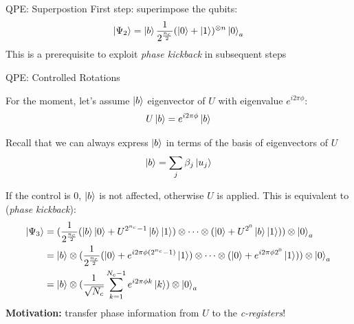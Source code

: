 \begin{frame}{QPE: Superpostion}
    First step: superimpose the qubits:
    \begin{equation*}
        \ket{\Psi_2} = \ket{b} \frac{1}{2^{\frac{n_c}{2}}} (\ket{0}+\ket{1})^{\otimes n} \ket{0}_a
    \end{equation*}
    This is a prerequisite to exploit \textit{phase kickback} in subsequent steps
\end{frame}

\begin{frame}[allowframebreaks]{QPE: Controlled Rotations}

    For the moment, let's assume $\ket{b}$ eigenvector of $U$ with eigenvalue $e^{i2\pi \phi}$:
    \begin{equation*}
        U \ket{b} = e^{i2\pi \phi} \ket{b}
    \end{equation*}

    Recall that we can always express $\ket{b}$ in terms of the basis of eigenvectors of $U$
    \begin{equation*}
        \ket{b} = \sum_j \beta_j \ket{u_j}
    \end{equation*}

    \framebreak
    
    If the control is $0$, $\ket{b}$ is not affected, otherwise $U$ is applied. This is equivalent to (\textit{phase kickback}):
    \begin{align*}
        \ket{\Psi_3} 
        &= (\frac{1}{2^{\frac{n_c}{2}}} (\ket{b}\ket{0}+U^{2^{n_c}-1}\ket{b}\ket{1}) \otimes \cdots \otimes (\ket{0}+U^{2^0}\ket{b}\ket{1})) \otimes \ket{0}_a \\
        &= \ket{b} \otimes (\frac{1}{2^{\frac{n_c}{2}}} (\ket{0}+e^{i2\pi \phi (2^{n_c}-1)}\ket{1}) \otimes \cdots \otimes (\ket{0}+e^{i2\pi \phi 2^{0}}\ket{1})) \otimes \ket{0}_a \\
        &= \ket{b} \otimes (\frac{1}{\sqrt{N_c}}\sum_{k=1}^{N_c-1} e^{i2\pi \phi k} \ket{k}) \otimes \ket{0}_a 
    \end{align*}
    \textbf{Motivation:} transfer phase information from $U$ to the \textit{c-registers}!
\end{frame}

